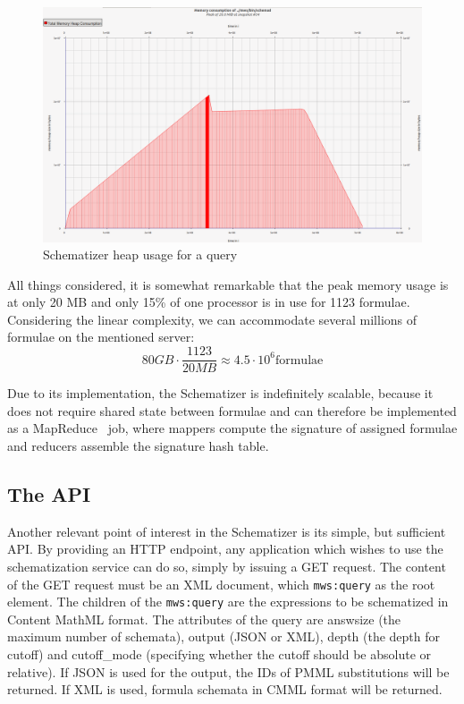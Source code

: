 \documentclass[a4paper,oneside]{article}
\def\cmml{\textsf{Content MathML}\xspace}
\def\xml{\textsf{XML}\xspace}
\begin{document}
\begin{figure}[ht]\centering
    \includegraphics[width=12.8cm]{img/heapUsage.png}
    \caption{Schematizer heap usage for a query}\label{fig:heap_usage}
\end{figure}
\FloatBarrier

All things considered, it is somewhat remarkable that the peak memory usage
is at only 20 MB and only 15\% of one processor is in use for 1123 formulae.
Considering the linear complexity, we can accommodate several millions of
formulae on the mentioned server:
$$80 GB \cdot \frac{1123}{20 MB} \approx 4.5 \cdot {10}^{6} \text{formulae}$$

Due to its implementation, the Schematizer is indefinitely scalable, because it
does not require shared state between formulae and can therefore be implemented
as a MapReduce~\cite{mapreduce} job, where mappers compute the signature of
assigned formulae and reducers assemble the signature hash table.

\subsection{The API}\label{subsec:schematizer_api}
Another relevant point of interest in the Schematizer is its simple, but
sufficient API. By providing an HTTP endpoint, any application which wishes to
use the schematization service can do so, simply by issuing a GET request.
The content of the GET request must be an \xml document, which \verb|mws:query|
as the root element. The children of the \verb|mws:query| are the expressions
to be schematized in \cmml format. The attributes of the query are
\textsf{answsize} (the maximum number of schemata), \textsf{output} (JSON or
XML), \textsf{depth} (the depth for cutoff) and \textsf{cutoff\_mode}
(specifying whether the cutoff should be absolute or relative).  If JSON is
used for the output, the IDs of PMML substitutions will be returned. If XML is
used, formula schemata in CMML format will be returned.
\end{document}
